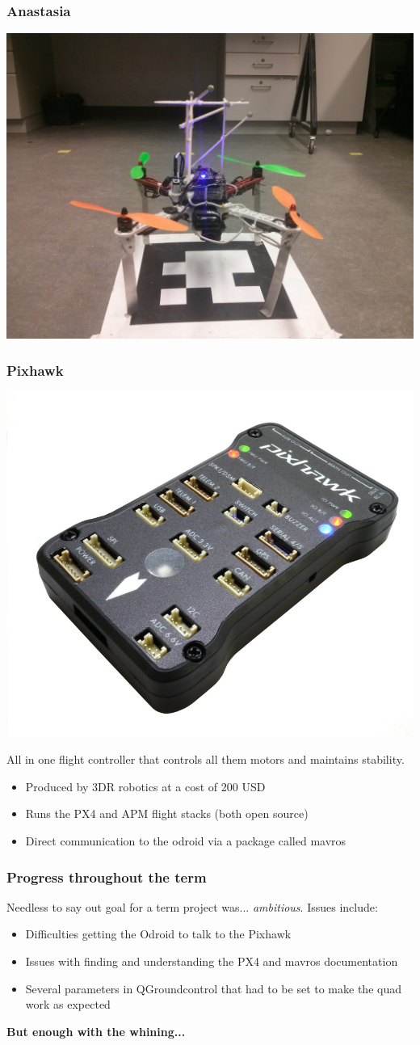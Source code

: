 \documentclass{beamer}
\begin{document}
\begin{frame}
    \frametitle{Anastasia}
    \includegraphics[width=\linewidth]{images/quad.jpg}
\end{frame}


\begin{frame}
    \frametitle{Pixhawk}
    \begin{center}
    \includegraphics[width=0.25\linewidth]{images/pixhawk_crappy_thing.jpg}
    \end{center}
    
    
    All in one flight controller that controls all them motors and maintains stability.
    	\begin{itemize}
        		\item Produced by 3DR robotics at a cost of 200 USD
        		\item Runs the PX4 and APM flight stacks (both open source)
        		\item Direct communication to the odroid via a package called mavros
        	\end{itemize}    
\end{frame}

\begin{frame}
	\frametitle{Progress throughout the term}
	Needless to say out goal for a term project was... \textit{ambitious}. Issues include:
	\begin{itemize}
        		\item Difficulties getting the Odroid to talk to the Pixhawk
        		\item Issues with finding and understanding the PX4 and mavros documentation 
        		\item Several parameters in QGroundcontrol that had to be set to make the quad work as expected
    \end{itemize}  
    
    \textbf{But enough with the whining...}

\end{frame}
\end{document}
